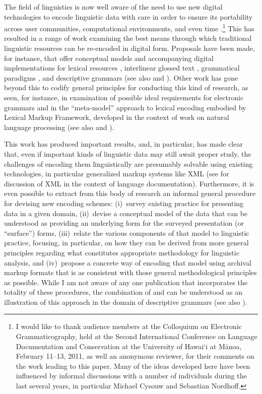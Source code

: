 The field of linguistics is now well aware of the need to use new digital
technologies to encode linguistic data with care in order to ensure its
portability across user communities, computational environments, and even time
\citep{Bir:Sim:03}.\footnote{I
 would like to thank audience members at the Colloquium on Electronic Grammaticography,
 held at the Second International Conference on Language Documentation and Conservation
 at the University of Hawai`i at M\=anoa, February 11--13, 2011, as well an anonymous
 reviewer, for their comments on the work leading to this paper.
 Many of the ideas developed here have been influenced by informal discussions
 with a number of individuals during the last several years,
 in particular Michael Cysouw and Sebastian Nordhoff.}
This has resulted in a
range of work examining the best means through which traditional linguistic
resources can be re-encoded in digital form. Proposals have been made, for
instance, that offer conceptual models and accompanying digital implementations
for lexical resources \citep{BellBird:2000,PoornimaGood:2010}, interlinear
glossed text \citep{BBB:2003,SchroeterThieberger:2006,PalmerErk:2007},
grammatical paradigms \citep{PentonEtAl:2004}, and descriptive grammars
\citep{Good:2004Metadatabase} (see also \citet{Drudetv} and \citet{Thiebergertv}). Other work has gone beyond this to codify general
principles for conducting this kind of research, as seen, for instance, in
 examination of possible ideal requirements for
electronic grammars and in the ``meta-model'' approach to lexical encoding
embodied by Lexical Markup Framework, developed in the context of work on
natural language processing \citep{Francopoulo:2009} (see also
 and ).

This work has produced important results, and, in particular, has made clear
that, even if important kinds of linguistic data may still await proper study,
the challenges of encoding them linguistically are presumably solvable using
existing technologies, in particular generalized markup systems like XML (see
 for discussion of XML in the context of
language documentation). Furthermore, it is even possible to extract from this
body of research an informal general procedure for devising new encoding
schemes: (i)~survey existing practice for presenting data in a given domain,
(ii)~devise a conceptual model of the data that can be understood as providing
an underlying form for the surveyed presentation (or ``surface'') forms,
(iii)~relate the various components of that model to linguistic practice,
focusing, in particular, on how they can be derived from more general principles
regarding what constitutes appropriate  methodology for linguistic analysis, and
(iv)~propose a concrete way of encoding that model using archival markup formats
that is as consistent with those general methodological principles as possible.
While I am not aware of any one publication that incorporates the totality of
these procedures, the combination of  and
 can be understood as an illustration of this approach
in the domain of descriptive grammars (see also \citet{Nordhofftv}).

